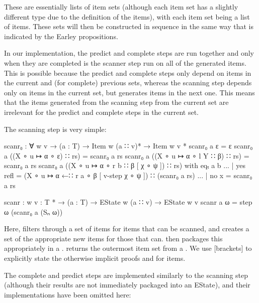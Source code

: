 		These are essentially lists of item sets (although each item set has a
		slightly different type due to the definition of the items), with each
		item set being a list of items. These sets will then be constructed in
		sequence in the same way that is indicated by the Earley propositions.

		In our implementation, the predict and complete steps are run together
		and only when they are completed is the scanner step run on all of the
		generated items. This is possible because the predict and complete
		steps only depend on items in the current and (for complete) previous
		sets, whereas the scanning step depends only on items in the current
		set, but generates items in the next one. This means that the items
		generated from the scanning step from the current set are irrelevant
		for the predict and complete steps in the current set.

		The scanning step is very simple:

		\begin{code}
			  scanr₀ : ∀ {w v} →
			    (a : T) →
			    Item w (a ∷ v)* →
			    Item w v *
			  scanr₀ a ε = ε
			  scanr₀ a ((X ∘ u ↦ α ∘ ε) ∷ rs) = scanr₀ a rs
			  scanr₀ a ((X ∘ u ↦ α ∘ l Y ∷ β) ∷ rs) = scanr₀ a rs
			  scanr₀ a ((X ∘ u ↦ α ∘ r b ∷ β [ χ ∘ ψ ]) ∷ rs) with eqₜ a b
			  ... | yes refl = (X ∘ u ↦ α ←∷ r a ∘ β [ v-step χ ∘ ψ ]) ∷ (scanr₀ a rs)
			  ... | no x = scanr₀ a rs

			  scanr : {w v : T *} →
			    (a : T) →
			    EState w (a ∷ v) →
			    EState w v
			  scanr a ω = step ω (scanr₀ a (Sₙ ω))
		\end{code}

		Here,  filters through a set of items for items that can
		be scanned, and creates a set of the appropriate new items for those
		that can.  then packages this appropriately in a
		.  returns the outermost item set from a
		. We use [brackets] to explicitly state the otherwise
		implicit proofs  and  for items.

		The complete and predict steps are implemented similarly to the
		scanning step (although their results are not immediately packaged into
		an EState), and their implementations have been omitted here:

